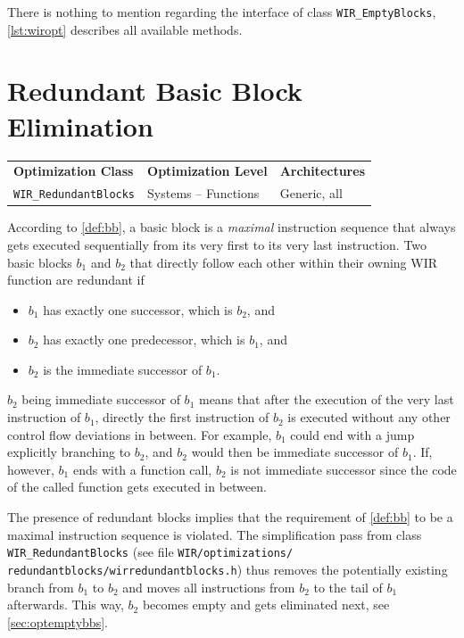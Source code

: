 There is nothing to mention regarding the interface of class \texttt{WIR\_EmptyBlocks}, \cref{lst:wiropt} describes all available methods.


\section{Redundant Basic Block Elimination}
\label{sec:optredundantbbs}

\begin{tabular}{|l|l|l|}
  \hline
  \textbf{Optimization Class} & \textbf{Optimization Level} & \textbf{Architectures} \\
  \hhline{|=|=|=|}
  \texttt{WIR\_RedundantBlocks} & Systems -- Functions & Generic, all \\
  \hline
\end{tabular}

According to \cref{def:bb}, a basic block is a \emph{maximal} instruction sequence that always gets executed sequentially from its very first to its very last instruction.
Two basic blocks $b_1$ and $b_2$ that directly follow each other within their owning \gls{WIR} function are redundant if
\begin{itemize}
  \item $b_1$ has exactly one successor, which is $b_2$, and
  \item $b_2$ has exactly one predecessor, which is $b_1$, and
  \item $b_2$ is the immediate successor of $b_1$.
\end{itemize}
$b_2$ being immediate successor of $b_1$ means that after the execution of the very last instruction of $b_1$, directly the first instruction of $b_2$ is executed without any other control flow deviations in between.
For example, $b_1$ could end with a jump explicitly branching to $b_2$, and $b_2$ would then be immediate successor of $b_1$.
If, however, $b_1$ ends with a function call, $b_2$ is not immediate successor since the code of the called function gets executed in between.

The presence of redundant blocks implies that the requirement of \cref{def:bb} to be a maximal instruction sequence is violated.
The simplification pass from class \texttt{WIR\_RedundantBlocks} (see file \texttt{WIR/optimizations/ redundantblocks/wirredundantblocks.h}) thus removes the potentially existing branch from $b_1$ to $b_2$ and moves all instructions from $b_2$ to the tail of $b_1$ afterwards.
This way, $b_2$ becomes empty and gets eliminated next, see \cref{sec:optemptybbs}.


